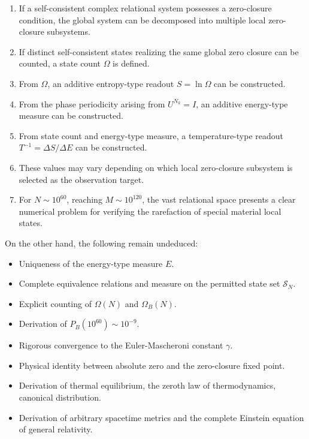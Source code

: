 \documentclass[
  a4paper,
]{article}
\providecommand{\tightlist}{%
  \setlength{\itemsep}{0pt}\setlength{\parskip}{0pt}}
\begin{document}
\begin{enumerate}
\def\labelenumi{\arabic{enumi}.}
\tightlist
\item
  If a self-consistent complex relational system possesses a
  zero-closure condition, the global system can be decomposed into
  multiple local zero-closure subsystems.
\item
  If distinct self-consistent states realizing the same global zero
  closure can be counted, a state count \(\Omega\) is defined.
\item
  From \(\Omega\), an additive entropy-type readout \(S=\ln\Omega\) can
  be constructed.
\item
  From the phase periodicity arising from \(U^{N_k}=I\), an additive
  energy-type measure can be constructed.
\item
  From state count and energy-type measure, a temperature-type readout
  \(T^{-1}=\Delta S/\Delta E\) can be constructed.
\item
  These values may vary depending on which local zero-closure subsystem
  is selected as the observation target.
\item
  For \(N\sim10^{60}\), reaching \(M\sim10^{120}\), the vast relational
  space presents a clear numerical problem for verifying the rarefaction
  of special material local states.
\end{enumerate}

On the other hand, the following remain undeduced:

\begin{itemize}
\tightlist
\item
  Uniqueness of the energy-type measure \(E\).
\item
  Complete equivalence relations and measure on the permitted state set
  \(\mathcal{S}_N\).
\item
  Explicit counting of \(\Omega(N)\) and \(\Omega_B(N)\).
\item
  Derivation of \(P_B(10^{60})\sim10^{-9}\).
\item
  Rigorous convergence to the Euler-Mascheroni constant \(\gamma\).
\item
  Physical identity between absolute zero and the zero-closure fixed
  point.
\item
  Derivation of thermal equilibrium, the zeroth law of thermodynamics,
  canonical distribution.
\item
  Derivation of arbitrary spacetime metrics and the complete Einstein
  equation of general relativity.
\end{itemize}
\end{document}
